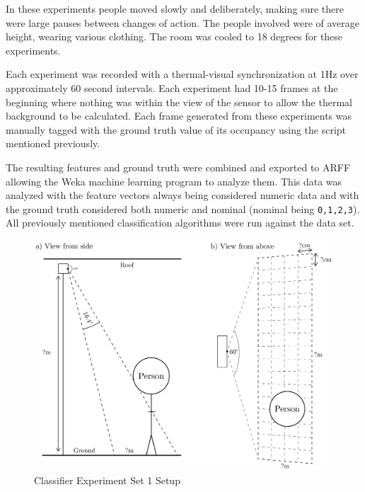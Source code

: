 \documentclass[../thesis/thesis.tex]{subfiles}
\begin{document}
In these experiments people moved slowly and deliberately, making sure there were large pauses between changes of action. The people involved were of average height, wearing various clothing. The room was cooled to 18 degrees for these experiments.

Each experiment was recorded with a thermal-visual synchronization at 1Hz over approximately 60 second intervals. Each experiment had 10-15 frames at the beginning where nothing was within the view of the sensor to allow the thermal background to be calculated. Each frame generated from these experiments was manually tagged with the ground truth value of its occupancy using the script mentioned previously.

The resulting features and ground truth were combined and exported to ARFF allowing the Weka machine learning program to analyze them. This data was analyzed with the feature vectors always being considered numeric data and with the ground truth considered both numeric and nominal (nominal being \texttt{{0,1,2,3}}). All previously mentioned classification algorithms were run against the data set.


\begin{landscape}
 \begin{figure}
 \centering
 \includegraphics[height=\textheight]{../diagrams/third-exp-setup2.pdf}
 \caption{Classifier Experiment Set 1 Setup}
 \label{fig:exps:3setup}
 \end{figure}
\end{landscape}

\end{document}
